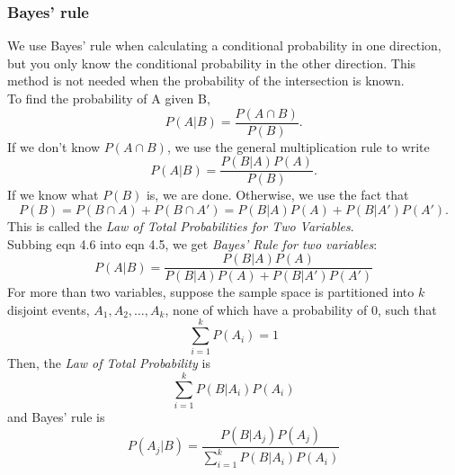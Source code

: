             \subsubsection{Bayes' rule}  %
                We use Bayes' rule when calculating a conditional probability in one direction, but you only know the conditional probability in the other direction. This method is not needed when the probability of the intersection is known. \\
                To find the probability of A given B,
                \begin{equation}
                    P(A\vert B)=\frac{P(A\cap B)}{P(B)}.
                \end{equation}
                If we don't know $P(A\cap B)$, we use the general multiplication rule to write
                \begin{equation}
                    P(A\vert B)=\frac{P(B\vert A)P(A)}{P(B)}.
                \end{equation}
                If we know what $P(B)$ is, we are done. Otherwise, we use the fact that
                \begin{equation}
                    P(B)=P(B\cap A)+P(B\cap A')=P(B\vert A)P(A) + P(B\vert A')P(A').
                \end{equation}
                This is called the \emph{Law of Total Probabilities for Two Variables}. \\
                Subbing eqn 4.6 into eqn 4.5, we get \emph{Bayes' Rule for two variables}:
                \begin{equation}
                    P(A\vert B)=\frac{P(B\vert A)P(A)}{P(B\vert A)P(A)+P(B\vert A')P(A')}
                \end{equation}
                For more than two variables, suppose the sample space is partitioned into $k$ disjoint events, $A_1, A_2, \ldots, A_k$, none of which have a probability of 0, such that
                \begin{equation} \sum^k_{i=1}P(A_i)=1 \end{equation}
                Then, the \emph{Law of Total Probability} is
                \begin{equation} \sum^k_{i=1}P(B\vert A_i)P(A_i) \end{equation}
                and Bayes' rule is
                \begin{equation} P(A_j\vert B)=\frac{P(B\vert A_j)P(A_j)}{\sum^k_{i=1}P(B\vert A_i)P(A_i)} \end{equation}
